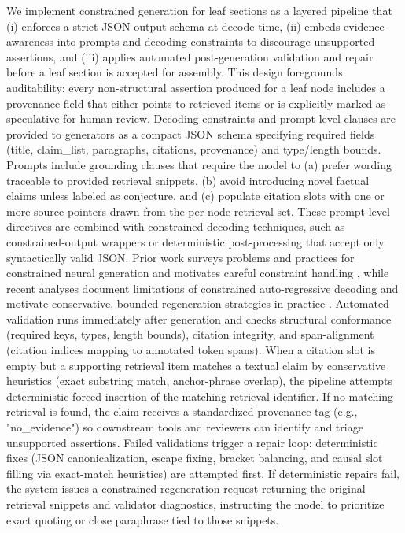 \documentclass{article}%
\begin{document}
%
We implement constrained generation for leaf sections as a layered pipeline that (i) enforces a strict JSON output schema at decode time, (ii) embeds evidence-awareness into prompts and decoding constraints to discourage unsupported assertions, and (iii) applies automated post-generation validation and repair before a leaf section is accepted for assembly.
This design foregrounds auditability: every non-structural assertion produced for a leaf node includes a provenance field that either points to retrieved items or is explicitly marked as speculative for human review.
Decoding constraints and prompt-level clauses are provided to generators as a compact JSON schema specifying required fields (title, claim_list, paragraphs, citations, provenance) and type/length bounds.
Prompts include grounding clauses that require the model to (a) prefer wording traceable to provided retrieval snippets, (b) avoid introducing novel factual claims unless labeled as conjecture, and (c) populate citation slots with one or more source pointers drawn from the per-node retrieval set.
These prompt-level directives are combined with constrained decoding techniques, such as constrained-output wrappers or deterministic post-processing that accept only syntactically valid JSON.
Prior work surveys problems and practices for constrained neural generation and motivates careful constraint handling \cite{web_garbacea_2022_why_is_constrained_neural_language_generation_pa},
while recent analyses document limitations of constrained auto-regressive decoding and motivate conservative, bounded regeneration strategies in practice \cite{web_wu_2025_constrained_auto_regressive_decoding_constrains_}.
Automated validation runs immediately after generation and checks structural conformance (required keys, types, length bounds), citation integrity, and span-alignment (citation indices mapping to annotated token spans).
When a citation slot is empty but a supporting retrieval item matches a textual claim by conservative heuristics (exact substring match, anchor-phrase overlap), the pipeline attempts deterministic forced insertion of the matching retrieval identifier.
If no matching retrieval is found, the claim receives a standardized provenance tag (e.g., "no_evidence") so downstream tools and reviewers can identify and triage unsupported assertions.
Failed validations trigger a repair loop: deterministic fixes (JSON canonicalization, escape fixing, bracket balancing, and causal slot filling via exact-match heuristics) are attempted first.
If deterministic repairs fail, the system issues a constrained regeneration request returning the original retrieval snippets and validator diagnostics, instructing the model to prioritize exact quoting or close paraphrase tied to those snippets.
\end{document}
